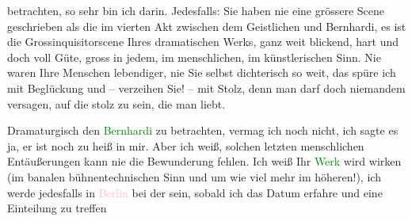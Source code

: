                betrachten, so sehr bin ich darin. Jedesfalls: Sie haben nie eine grössere Scene
               geschrieben als die im vierten Akt zwischen dem Geistlichen und Bernhardi, es ist die
               Grossinquisitorscene Ihres dramatischen Werks, ganz weit blickend, hart und doch voll
               Güte, gross in jedem, im menschlichen, im künstlerischen Sinn. Nie waren Ihre
               Menschen lebendiger, nie Sie selbst dichterisch so weit, das spüre ich mit Beglückung
               und – verzeihen Sie! – mit Stolz, denn man darf doch niemandem versagen, auf die
               stolz zu sein, die man liebt.\pend
           
\pstart
           Dramaturgisch den \textcolor{green}{Bernhardi}\ledrightnote{\textcolor{green}{Professor Bernhardi. Komödie in fünf Akten}} zu betrachten,
               vermag ich noch nicht, ich sagte es ja, er ist noch zu heiß in mir. Aber ich weiß,
               solchen letzten menschlichen Entäußerungen kann nie {\pb}die Bewunderung fehlen. Ich weiß Ihr \textcolor{green}{Werk}\ledrightnote{{$\rightarrow$}\emph{\textcolor{green}{Professor Bernhardi. Komödie in fünf Akten}}} wird wirken (im banalen
               bühnentechnischen Sinn und um wie viel mehr im höheren!), ich werde jedesfalls in \textcolor{pink}{Berlin}\ledrightnote{\textcolor{pink}{Berlin}} bei der \label{K_L03639-3v}\label{K_L03639-3} sein, sobald ich das Datum erfahre und eine Einteilung zu treffen
